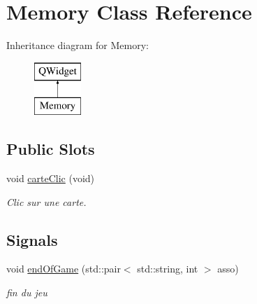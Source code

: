 \hypertarget{class_memory}{}\section{Memory Class Reference}
\label{class_memory}
Inheritance diagram for Memory\+:\begin{figure}[H]
\begin{center}
\leavevmode
\includegraphics[height=2.000000cm]{class_memory}
\end{center}
\end{figure}
\subsection*{Public Slots}
\begin{DoxyCompactItemize}
\item 
\mbox{\label{class_memory_af967fc9232b5f014ad2d5b020c463727}} 
void \hyperlink{class_memory_af967fc9232b5f014ad2d5b020c463727}{carte\+Clic} (void)
\begin{DoxyCompactList}\small\item\em Clic sur une carte. \end{DoxyCompactList}\end{DoxyCompactItemize}
\subsection*{Signals}
\begin{DoxyCompactItemize}
\item 
\mbox{\label{class_memory_a94744018f48144f6089011c74ee1a13b}} 
void \hyperlink{class_memory_a94744018f48144f6089011c74ee1a13b}{end\+Of\+Game} (std\+::pair$<$ std\+::string, int $>$ asso)
\begin{DoxyCompactList}\small\item\em fin du jeu \end{DoxyCompactList}\end{DoxyCompactItemize}
